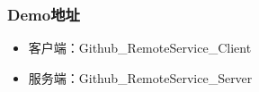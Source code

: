 \documentclass[9pt, b5paper]{article}
\begin{document}
\subsubsection{Demo地址}
\label{sec-5-6-4}
\begin{itemize}
\item 客户端：Github\_RemoteService\_Client
\item 服务端：Github\_RemoteService\_Server
\end{itemize}
\end{document}
